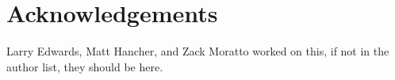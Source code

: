 \chapter*{Acknowledgements}

Larry Edwards, Matt Hancher, and Zack Moratto worked on this, if not in the author list, they should be here.
